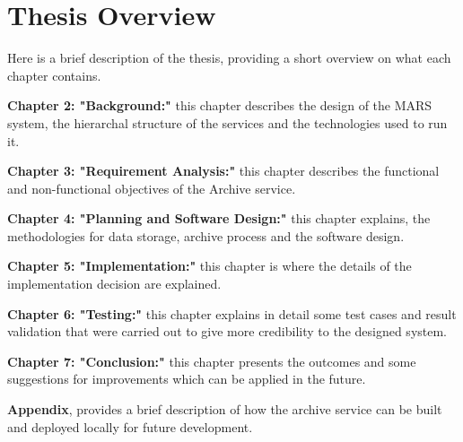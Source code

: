     \newpage
    \section{Thesis Overview} 
        Here is a brief description of the thesis, providing a short overview on what each
        chapter contains.
        
        \par
        \textbf{Chapter 2: "Background:"} this chapter describes the design
        of the MARS system, the hierarchal structure of the services and the technologies used to
        run it.

        \par
        \textbf{Chapter 3: "Requirement Analysis:"} this chapter describes the functional and
        non-functional objectives of the Archive service.

        \par
        \textbf{Chapter 4: "Planning and Software Design:"} this chapter explains, the 
        methodologies for data storage, archive process and the software design.

        \par
        \textbf{Chapter 5: "Implementation:"} this chapter is where the details of the 
        implementation decision are explained.

        \par
        \textbf{Chapter 6: "Testing:"} this chapter explains in detail 
        some test cases and result validation that were carried out to give more credibility to the designed system.

        \par
        \textbf{Chapter 7: "Conclusion:"} this chapter presents the outcomes and some 
        suggestions for improvements which can be applied in the future.
        
        \textbf{Appendix}, provides a brief description of how the archive service can be built and deployed locally for future development.

